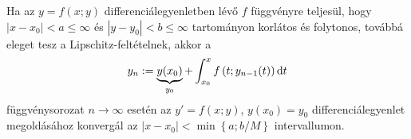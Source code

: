 \documentclass[main.tex]{subfiles}
\begin{document}

Ha az $y = f(x; y)$ differenciálegyenletben lévő
$f$ függvényre teljesül, hogy
$\left| x - x_0 \right| < a \leq \infty$ és
$\left| y - y_0 \right| < b \leq \infty$ tartományon
korlátos és folytonos, továbbá eleget tesz a
Lipschitz-feltételnek, akkor a
\begin{equation*}
  y_n
  := \underbrace{y(x_0)}_{y_0}
  + \int_{x_0}^x f\left(
  t; y_{n-1}(t)
  \right) \mathrm{d} t
\end{equation*}
függvénysorozat $n \rightarrow \infty$ esetén az
$y' = f(x; y)$, $y(x_0) = y_0$ differenciálegyenlet
megoldásához konvergál az  $\left| x - x_0 \right|
  < \min \left\{ a; b/M \right\}$  intervallumon.
\end{document}
